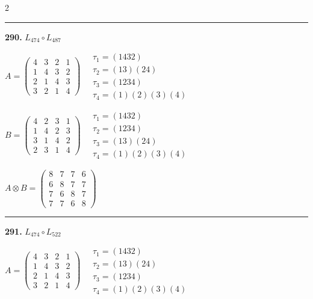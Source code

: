 \begin{multicols}{2}
\vspace{0.3em}
\hrule
\vspace{0.3em}

\noindent\textbf{290.} $L_{474} \circ L_{487}$

$A = \begin{pmatrix} 4 & 3 & 2 & 1 \\ 1 & 4 & 3 & 2 \\ 2 & 1 & 4 & 3 \\ 3 & 2 & 1 & 4 \end{pmatrix} \quad \begin{matrix} \tau_{1}=(1 4 3 2) \\ \tau_{2}=(1 3)(2 4) \\ \tau_{3}=(1 2 3 4) \\ \tau_{4}=(1)(2)(3)(4) \end{matrix}$

$B = \begin{pmatrix} 4 & 2 & 3 & 1 \\ 1 & 4 & 2 & 3 \\ 3 & 1 & 4 & 2 \\ 2 & 3 & 1 & 4 \end{pmatrix} \quad \begin{matrix} \tau_{1}=(1 4 3 2) \\ \tau_{2}=(1 2 3 4) \\ \tau_{3}=(1 3)(2 4) \\ \tau_{4}=(1)(2)(3)(4) \end{matrix}$

$A \otimes B = \begin{pmatrix} 8 & 7 & 7 & 6 \\ 6 & 8 & 7 & 7 \\ 7 & 6 & 8 & 7 \\ 7 & 7 & 6 & 8 \end{pmatrix}$

\vspace{0.3em}
\hrule
\vspace{0.3em}

\noindent\textbf{291.} $L_{474} \circ L_{522}$

$A = \begin{pmatrix} 4 & 3 & 2 & 1 \\ 1 & 4 & 3 & 2 \\ 2 & 1 & 4 & 3 \\ 3 & 2 & 1 & 4 \end{pmatrix} \quad \begin{matrix} \tau_{1}=(1 4 3 2) \\ \tau_{2}=(1 3)(2 4) \\ \tau_{3}=(1 2 3 4) \\ \tau_{4}=(1)(2)(3)(4) \end{matrix}$


\end{multicols}
